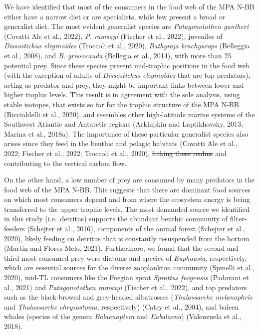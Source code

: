\documentclass[
]{article}
\providecommand{\DIFadd}[1]{{\protect\color{blue}\uwave{#1}}} %
\providecommand{\DIFdel}[1]{{\protect\color{red}\sout{#1}}}                      %
\providecommand{\DIFaddbegin}{} %
\providecommand{\DIFaddend}{} %
\providecommand{\DIFdelbegin}{} %
\providecommand{\DIFdelend}{} %
\newcommand{\DIFscaledelfig}{0.5}
\newlength{\DIFdelgraphicswidth} %
\newlength{\DIFdelgraphicsheight} %
\newcommand{\DIFaddincludegraphics}[2][]{{\color{blue}\fbox{\DIFOincludegraphics[#1]{#2}}}} %
\newcommand{\DIFdelincludegraphics}[2][]{%
\sbox{\DIFdelgraphicsbox}{\DIFOincludegraphics[#1]{#2}}%
\settoboxwidth{\DIFdelgraphicswidth}{\DIFdelgraphicsbox} %
\settoboxtotalheight{\DIFdelgraphicsheight}{\DIFdelgraphicsbox} %
\scalebox{\DIFscaledelfig}{%
\parbox[b]{\DIFdelgraphicswidth}{\usebox{\DIFdelgraphicsbox}\\[-\baselineskip] \rule{\DIFdelgraphicswidth}{0em}}\llap{\resizebox{\DIFdelgraphicswidth}{\DIFdelgraphicsheight}{%
\setlength{\unitlength}{\DIFdelgraphicswidth}%
\begin{picture}(1,1)%
\thicklines\linethickness{2pt} %
{\color[rgb]{1,0,0}\put(0,0){\framebox(1,1){}}}%
{\color[rgb]{1,0,0}\put(0,0){\line( 1,1){1}}}%
{\color[rgb]{1,0,0}\put(0,1){\line(1,-1){1}}}%
\end{picture}%
}\hspace*{3pt}}} %
} %
\DeclareRobustCommand{\DIFaddbegin}{\DIFOaddbegin \let\includegraphics\DIFaddincludegraphics} %
\DeclareRobustCommand{\DIFaddend}{\DIFOaddend \let\includegraphics\DIFOincludegraphics} %
\DeclareRobustCommand{\DIFdelbegin}{\DIFOdelbegin \let\includegraphics\DIFdelincludegraphics} %
\DeclareRobustCommand{\DIFdelend}{\DIFOaddend \let\includegraphics\DIFOincludegraphics} %
\begin{document}
We have identified that most of the consumers in the food web of the MPA
N-BB either have a narrow diet or are specialists, while few present a
broad or generalist diet. The most evident generalist species are
\emph{Patagonotothen guntheri} (Covatti Ale et al., 2022), \emph{P.
ramsayi} (Fischer et al., 2022), juveniles of \emph{Dissostichus
eleginoides} (Troccoli et al., 2020), \emph{Bathyraja brachyurops}
(Belleggia et al., 2008), and \emph{B. griseocauda} (Bellegia et al.,
2014), with more than 25 potential prey. Since these species present
mid-trophic positions in the food web (with the exception of adults of
\emph{Dissostichus eleginoides} that are top predators), acting as
predator and prey, they might be important links between lower and
higher trophic levels. This result is in agreement with the sole
analysis, using stable isotopes, that exists so far for the trophic
structure of the MPA N-BB (Riccialdelli et al., 2020), and resembles
other high-latitude marine systems of the Southwest Atlantic and
Antarctic regions (Arkhipkin and Laptikhovsky, 2013; Marina et al.,
2018a). The importance of these particular generalist species also
arises since they feed in the benthic and pelagic habitats (Covatti Ale
et al., 2022; Fischer et al., 2022; Troccoli et al., 2020), \DIFdelbegin \DIFdel{linking
these realms }\DIFdelend \DIFaddbegin \DIFadd{enhancing
the bentho-pelagic coupling }\DIFaddend and contributing to the vertical carbon
flow.

On the other hand, a low number of prey are consumed by many predators
in the food web of the MPA N-BB. This suggests that there are dominant
food sources on which most consumers depend and from where the ecosystem
energy is being transferred to the upper trophic levels. The most
demanded source we identified in this study (i.e.~detritus) supports the
abundant benthic community of filter-feeders (Schejter et al., 2016),
components of the animal forest (Schejter et al., 2020), likely feeding
on detritus that is constantly resuspended from the bottom (Martin and
Flores Melo, 2021). Furthermore, we found that the second and third-most
consumed prey were diatoms and species of \emph{Euphausia},
respectively, which are essential sources for the diverse zooplankton
community (Spinelli et al., 2020), mid-TL consumers like the Fuegian
sprat \emph{Sprattus fuegensis} (Padovani et al., 2021) and
\emph{Patagonotothen ramsayi} (Fischer et al., 2022), and top predators
such as the black-browed and grey-headed albatrosses (\emph{Thalassarche
melanophris} and \emph{Thalassarche chrysostoma}, respectively) (Catry
et al., 2004), and baleen whales (species of the genera
\emph{Balaenoptera} and \emph{Eubalaena}) (Valenzuela et al., 2018).
\end{document}
